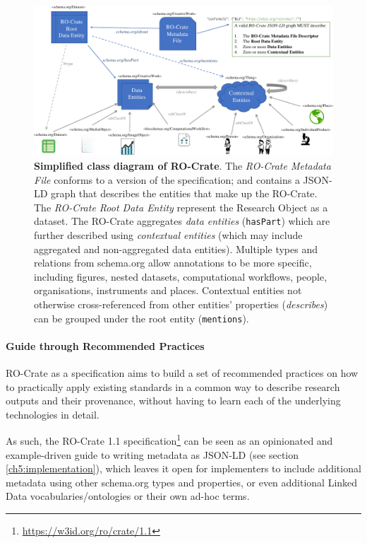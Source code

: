 \begin{figure}
\includegraphics[width=\textwidth]{figures/ch05/ro-crate-uml.pdf}
	\caption[Simplified class diagram of RO-Crate]{\textbf{Simplified class diagram of RO-Crate}. The 
\emph{RO-Crate Metadata File} conforms to a version of the specification;
and contains a JSON-LD graph \cite{w3-ldp} that describes the
entities that make up the RO-Crate. The \emph{RO-Crate Root Data
Entity} represent the Research Object as a dataset. The RO-Crate
aggregates \emph{data entities} (\texttt{hasPart}) which are further
described using \emph{contextual entities} (which may include
aggregated and non-aggregated data entities). Multiple types and
relations from schema.org allow annotations to be more specific,
including figures, nested datasets, computational workflows, people,
organisations, instruments and places. Contextual entities not
otherwise cross-referenced from other entities' properties 
(\emph{describes}) can be grouped under the root entity (\texttt{mentions}).}
\label{ch5:fig:uml}
\end{figure}

\paragraph{Guide through Recommended
Practices}\label{ch5:recommendedpractices}

RO-Crate as a specification aims to build a set of recommended practices
on how to practically apply existing standards in a common way to
describe research outputs and their provenance, without having to learn
each of the underlying technologies in detail.

As such, the RO-Crate 1.1
specification\footnote{\url{https://w3id.org/ro/crate/1.1}} \cite{rocrate1.1}
can be seen as an opinionated and example-driven guide to writing
\cite{Guha 2015} metadata as
JSON-LD \cite{w3-ldp} (see
section \vref{ch5:implementation}), which
leaves it open for implementers to include additional metadata using
other schema.org types and properties, or even additional Linked Data
vocabularies/ontologies or their own ad-hoc terms.


